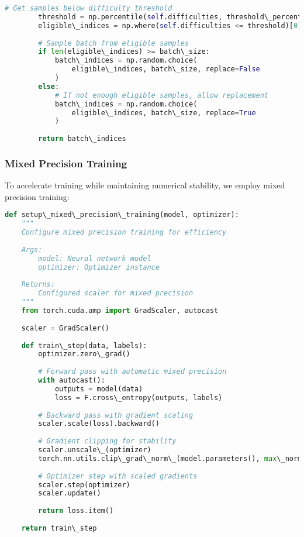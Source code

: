 \documentclass[journal]{IEEEtran}
\begin{document}
\begin{lstlisting}[language=Python, caption=Curriculum Learning Implementation]
        # Get samples below difficulty threshold
        threshold = np.percentile(self.difficulties, threshold\_percentile)
        eligible\_indices = np.where(self.difficulties <= threshold)[0]
        
        # Sample batch from eligible samples
        if len(eligible\_indices) >= batch\_size:
            batch\_indices = np.random.choice(
                eligible\_indices, batch\_size, replace=False
            )
        else:
            # If not enough eligible samples, allow replacement
            batch\_indices = np.random.choice(
                eligible\_indices, batch\_size, replace=True
            )
        
        return batch\_indices
\end{lstlisting}

\subsubsection{Mixed Precision Training}

To accelerate training while maintaining numerical stability, we employ mixed precision training:

\begin{lstlisting}[language=Python, caption=Mixed Precision Training Setup]
def setup\_mixed\_precision\_training(model, optimizer):
    """
    Configure mixed precision training for efficiency
    
    Args:
        model: Neural network model
        optimizer: Optimizer instance
    
    Returns:
        Configured scaler for mixed precision
    """
    from torch.cuda.amp import GradScaler, autocast
    
    scaler = GradScaler()
    
    def train\_step(data, labels):
        optimizer.zero\_grad()
        
        # Forward pass with automatic mixed precision
        with autocast():
            outputs = model(data)
            loss = F.cross\_entropy(outputs, labels)
        
        # Backward pass with gradient scaling
        scaler.scale(loss).backward()
        
        # Gradient clipping for stability
        scaler.unscale\_(optimizer)
        torch.nn.utils.clip\_grad\_norm\_(model.parameters(), max\_norm=1.0)
        
        # Optimizer step with scaled gradients
        scaler.step(optimizer)
        scaler.update()
        
        return loss.item()
    
    return train\_step
\end{lstlisting}
\end{document}
